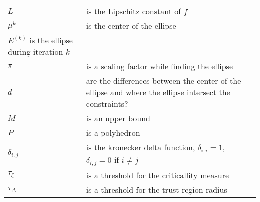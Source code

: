 \documentclass{article}
\theoremstyle{case}
\newcommand{\ellipsek}{{E^{(k)}}}
\begin{document}
\begin{longtable}{| p{} | p{} |}
$L$ & is the Lipschitz constant of $f$ \\
$\mu^k$ & is the center of the ellipse \\
$\ellipsek$ is the ellipse during iteration $k$ \\
$\pi$ & is a scaling factor while finding the ellipse \\
$d$ & are the differences between the center of the ellipse and where the ellipse intersect the constraints? \\
$M$ & is an upper bound \\
$P$ & is a polyhedron \\
$\delta_{i,j}$ & is the kronecker delta function, $\delta_{i,i} = 1$, $\delta_{i,j} = 0$ if $i\ne j$ \\
$\tau_{\xi}$ & is a threshold for the criticallity measure \\
$\tau_{\Delta}$ & is a threshold for the trust region radius
\label{tab:TableOfNotation}
\end{longtable}

\newpage




\end{document}
